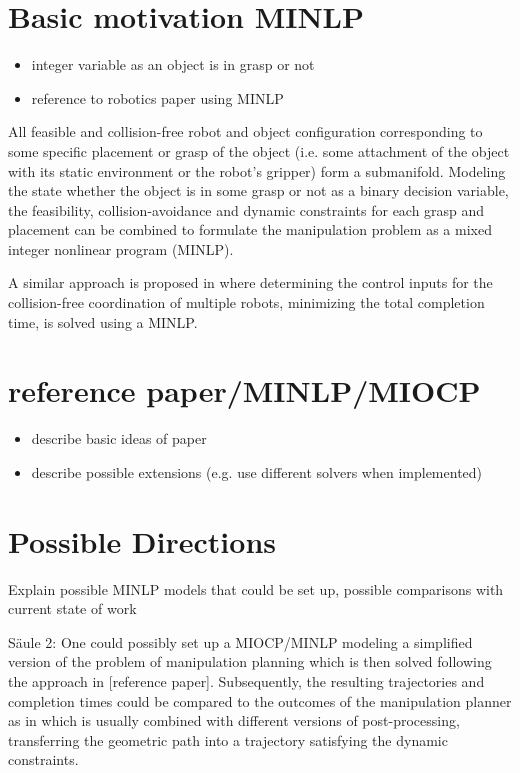 \documentclass{article}
\begin{document}
\section{Basic motivation MINLP}
\begin{itemize}
\item integer variable as an object is in grasp or not
\item reference to robotics paper \cite{peng2005coordinating} using MINLP
\end{itemize}

All feasible and collision-free robot and object configuration corresponding to some specific placement or grasp of the object (i.e. some attachment of the object with its static environment or the robot's gripper) form a submanifold. Modeling the state whether the object is in some grasp or not as a binary decision variable, the feasibility, collision-avoidance and dynamic constraints for each grasp and placement can be combined to formulate the manipulation problem as a mixed integer nonlinear program (MINLP). 

A similar approach is proposed in \cite{peng2005coordinating} where determining the control inputs for the collision-free coordination of multiple robots, minimizing the total completion time, is solved using a MINLP.

\section{reference paper/MINLP/MIOCP}
\begin{itemize}
\item describe basic ideas of paper
\item describe possible extensions (e.g. use different solvers when implemented)
\end{itemize}
\section{Possible Directions}
Explain possible MINLP models that could be set up, possible comparisons with current state of work

S\"aule 2: One could possibly set up a MIOCP/MINLP modeling a simplified version of the problem of manipulation planning which is then solved following the approach in [reference paper]. Subsequently, the resulting trajectories and completion times could be compared to the outcomes of the manipulation planner as in \cite{schmitt2017manipulation} which is usually combined with different versions of  post-processing, transferring the geometric path into a trajectory satisfying the dynamic constraints.
\end{document}
